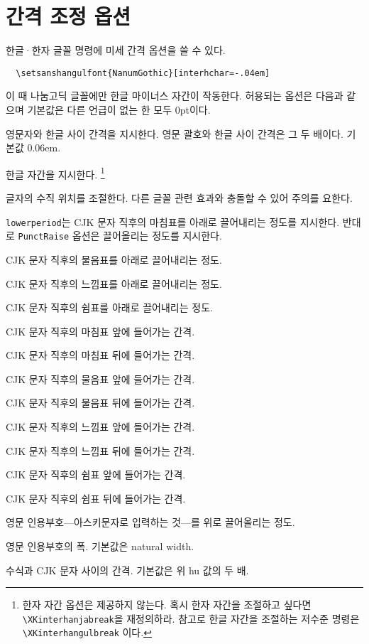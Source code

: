 \documentclass[a4paper]{article}
\def\cs#1{\texttt{\textbackslash #1}}
\def\hparens#1{\leavevmode\unskip---{\small #1}---\ignorespaces}
\begin{document}
\section{간격 조정 옵션}\label{sec:fontopts}
 한글·한자 글꼴 명령에 미세 간격 옵션을
쓸 수 있다.
\begin{verbatim}
  \setsanshangulfont{NanumGothic}[interhchar=-.04em]
\end{verbatim}
이 때 나눔고딕 글꼴에만 한글 마이너스 자간이 작동한다.
허용되는 옵션은 다음과 같으며 기본값은 다른 언급이 없는 한 모두 0pt이다.
\begin{description}\itemsep0pt
\item[hu, InterLatinCJK]
  영문자와 한글 사이 간격을 지시한다.
  영문 괄호와 한글 사이 간격은 그 두 배이다. 기본값 0.06em.
\item[interhchar, InterHangul]
  { 한글 자간을} 지시한다.%
  \footnote{한자 자간 옵션은 제공하지 않는다.
  혹시 한자 자간을 조절하고 싶다면 \cs{XKinterhanjabreak}을 재정의하라.
  참고로 한글 자간을 조절하는 저수준 명령은 \cs{XKinterhangulbreak} 이다.}
\item[charraise, CharRaise]
  글자의 {수직 위치}를 조절한다.
  다른 글꼴 관련 효과와 충돌할 수 있어 주의를 요한다.
\item[lowerperiod, PunctRaise]
  \verb+lowerperiod+는 CJK 문자 직후의 마침표를 아래로 끌어내리는
  {정도를 지시한다.
  반대로 \verb+PunctRaise+ 옵션은 끌어올리는 정도를 지시한다.}
\item[lowerquestion]
  CJK 문자 직후의 물음표를 아래로 끌어내리는 정도.
\item[lowerexclamation]
  CJK 문자 직후의 느낌표를 아래로 끌어내리는 정도.
\item[lowercomma]
  CJK 문자 직후의 쉼표를 아래로 끌어내리는 정도.
\item[preperiodkern]
  {CJK 문자 직후의 마침표 앞에
  들어가는 간격.}
\item[postperiodkern]
  {CJK 문자 직후의 마침표 뒤에
  들어가는 간격.}
\item[prequestionkern]
  CJK 문자 직후의 물음표 앞에 들어가는 간격.
\item[postquestionkern]
  CJK 문자 직후의 물음표 뒤에 들어가는 간격.
\item[preexclamationkern]
  CJK 문자 직후의 느낌표 앞에 들어가는 간격.
\item[postexclamationkern]
  CJK 문자 직후의 느낌표 뒤에 들어가는 간격.
\item[precommakern]
  CJK 문자 직후의 쉼표 앞에 들어가는 간격.
\item[postcommakern]
  CJK 문자 직후의 쉼표 뒤에 들어가는 간격.
\item[quoteraise]
  영문 인용부호\hparens{아스키문자로 입력하는 것}를
  위로 끌어올리는 정도.
\item[quotewidth]
  영문 인용부호의 폭. 기본값은 natural width.
\item[postmathskip]
  수식과 CJK 문자 사이의 간격.  기본값은 위 hu 값의 두 배.
\end{description}
\end{document}
